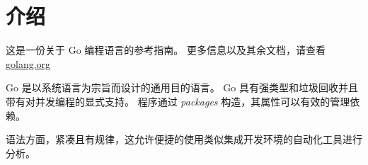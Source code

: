 
\chapter{介绍}
这是一份关于 Go 编程语言的参考指南。
更多信息以及其余文档，请查看 \href{www.golang.org}{golang.org}

Go 是以系统语言为宗旨而设计的通用目的语言。
Go 具有强类型和垃圾回收并且带有对并发编程的显式支持。
程序通过 \emph{packages} 构造，其属性可以有效的管理依赖。

语法方面，紧凑且有规律，这允许便捷的使用类似集成开发环境的自动化工具进行分析。